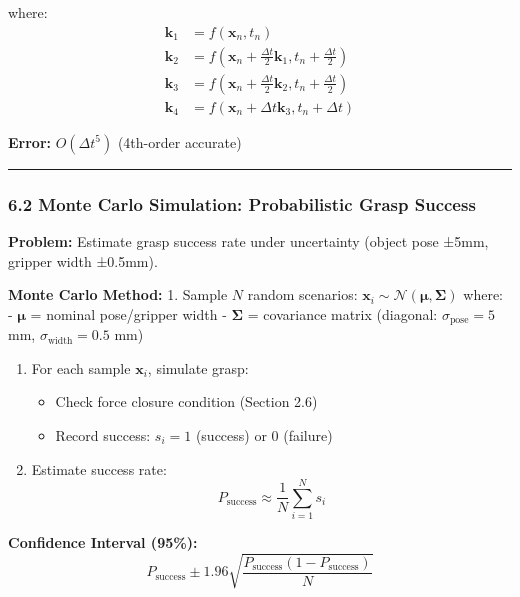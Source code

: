 \documentclass[
]{article}
\providecommand{\tightlist}{%
  \setlength{\itemsep}{0pt}\setlength{\parskip}{0pt}}
\begin{document}
where: \[
\begin{aligned}
\mathbf{k}_1 &= f(\mathbf{x}_n, t_n) \\
\mathbf{k}_2 &= f(\mathbf{x}_n + \frac{\Delta t}{2} \mathbf{k}_1, t_n + \frac{\Delta t}{2}) \\
\mathbf{k}_3 &= f(\mathbf{x}_n + \frac{\Delta t}{2} \mathbf{k}_2, t_n + \frac{\Delta t}{2}) \\
\mathbf{k}_4 &= f(\mathbf{x}_n + \Delta t \mathbf{k}_3, t_n + \Delta t)
\end{aligned}
\]

\textbf{Error:} \(O(\Delta t^5)\) (4th-order accurate)

\begin{center}\rule{0.5\linewidth}{0.5pt}\end{center}

\hypertarget{monte-carlo-simulation-probabilistic-grasp-success}{%
\subsubsection{6.2 Monte Carlo Simulation: Probabilistic Grasp
Success}\label{monte-carlo-simulation-probabilistic-grasp-success}}

\textbf{Problem:} Estimate grasp success rate under uncertainty (object
pose ±5mm, gripper width ±0.5mm).

\textbf{Monte Carlo Method:} 1. Sample \(N\) random scenarios:
\(\mathbf{x}_i \sim \mathcal{N}(\boldsymbol{\mu}, \boldsymbol{\Sigma})\)
where: - \(\boldsymbol{\mu}\) = nominal pose/gripper width -
\(\boldsymbol{\Sigma}\) = covariance matrix (diagonal:
\(\sigma_{\text{pose}} = 5\) mm, \(\sigma_{\text{width}} = 0.5\) mm)

\begin{enumerate}
\def\labelenumi{\arabic{enumi}.}
\setcounter{enumi}{1}
\tightlist
\item
  For each sample \(\mathbf{x}_i\), simulate grasp:

  \begin{itemize}
  \tightlist
  \item
    Check force closure condition (Section 2.6)
  \item
    Record success: \(s_i = 1\) (success) or \(0\) (failure)
  \end{itemize}
\item
  Estimate success rate: \[
  P_{\text{success}} \approx \frac{1}{N} \sum_{i=1}^N s_i
  \]
\end{enumerate}

\textbf{Confidence Interval (95\%):} \[
P_{\text{success}} \pm 1.96 \sqrt{\frac{P_{\text{success}} (1 - P_{\text{success}})}{N}}
\]
\end{document}

